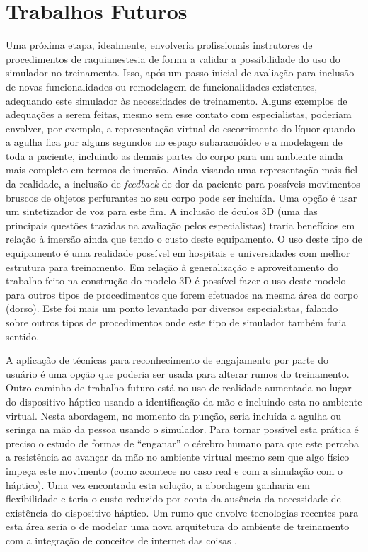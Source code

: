 \section{Trabalhos Futuros}
\label{sec:trabFuturo}

Uma próxima etapa, idealmente, envolveria profissionais instrutores de procedimentos de raquianestesia de forma a validar a possibilidade do uso do simulador no treinamento. Isso, após um passo inicial de avaliação para inclusão de novas funcionalidades ou remodelagem de funcionalidades existentes, adequando este simulador às necessidades de treinamento. Alguns exemplos de adequações a serem feitas, mesmo sem esse contato com especialistas, poderiam envolver, por exemplo, a representação virtual do escorrimento do líquor quando a agulha fica por alguns segundos no espaço subaracnóideo e a modelagem de toda a paciente, incluindo as demais partes do corpo para um ambiente ainda mais completo em termos de imersão. Ainda visando uma representação mais fiel da realidade, a inclusão de \textit{feedback} de dor da paciente para possíveis movimentos bruscos de objetos perfurantes no seu corpo pode ser incluída. Uma opção é usar um sintetizador de voz para este fim. A inclusão de óculos 3D (uma das principais questões trazidas na avaliação pelos especialistas) traria benefícios em relação à imersão ainda que tendo o custo deste equipamento. O uso deste tipo de equipamento é uma realidade possível em hospitais e universidades com melhor estrutura para treinamento.
Em relação à generalização e aproveitamento do trabalho feito na construção do modelo 3D é possível fazer o uso deste modelo para outros tipos de procedimentos que forem efetuados na mesma área do corpo (dorso). Este foi mais um ponto levantado por diversos especialistas, falando sobre outros tipos de procedimentos onde este tipo de simulador também faria sentido.

A aplicação de técnicas para reconhecimento de engajamento por parte do usuário \cite{Mitsis2022} é uma opção que poderia ser usada para alterar rumos do treinamento.
Outro caminho de trabalho futuro está no uso de realidade aumentada no lugar do dispositivo háptico usando a identificação da mão e incluindo esta no ambiente virtual. Nesta abordagem, no momento da punção, seria incluída a agulha ou seringa na mão da pessoa usando o simulador. Para tornar possível esta prática é preciso o estudo de formas de ``enganar'' o cérebro humano para que este perceba a resistência ao avançar da mão no ambiente virtual mesmo sem que algo físico impeça este movimento (como acontece no caso real e com a simulação com o háptico). Uma vez encontrada esta solução, a abordagem ganharia em flexibilidade e teria o custo reduzido por conta da ausência da necessidade de existência do dispositivo háptico. Um rumo que envolve tecnologias recentes para esta área seria o de modelar uma nova arquitetura do ambiente de treinamento com a integração de conceitos de internet das coisas \cite{Ahmad2022}.